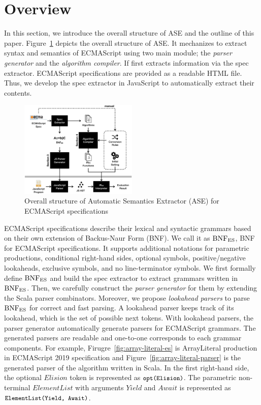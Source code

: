\section{Overview}

In this section, we introduce the overall structure of ASE and the outline of
this paper. Figure~\ref{fig:overview} depicts the overall structure of ASE.
It mechanizes to extract syntax and semantics of ECMAScript using
two main module; the \textit{parser generator} and the \textit{algorithm compiler}.
If first extracts information via the spec extractor.
ECMAScript specifications are provided as a readable HTML file.
Thus, we develop the spec extractor in JavaScript to automatically
extract their contents.

\begin{figure}
  \centering
  \includegraphics[width=0.5\textwidth]{img/overview.png}
  \caption{Overall structure of Automatic Semantics Extractor (ASE)
  for ECMAScript specifications}
  \label{fig:overview}
\end{figure}

ECMAScript specifications describe their lexical and syntactic grammars
based on their own extension of Backus-Naur Form (BNF).
We call it as \( \text{BNF}_{\text{ES}} \), BNF for ECMAScript specifications.
It supports additional notations for parametric productions, conditional
right-hand sides, optional symbols, positive/negative lookaheads,
exclusive symbols, and no line-terminator symbols. We first formally define
\( \text{BNF}_{\text{ES}} \) and build the spec extractor to extract grammars written in \( \text{BNF}_{\text{ES}} \).
Then, we carefully construct the \textit{parser generator} for them by extending
the Scala parser combinators. Moreover, we propose \textit{lookahead parsers}
to parse \( \text{BNF}_{\text{ES}} \) for correct and fast parsing.
A lookahead parser keeps track of its lookahead, which is the set of
possible next tokens. With lookahead parsers,
the parser generator automatically generate parsers for ECMAScript grammars.
The generated parsers are readable and one-to-one corresponds to each
grammar components.
For example, Firugre~\ref{fig:array-literal-es} is ArrayLiteral production in
ECMAScript 2019 specification and Figure~\ref{fig:array-literal-parser}
is the generated parser of the algorithm written in Scala.
In the first right-hand side, the optional \( Elision \) token
is represented as \( \texttt{\small opt(Elision)} \).
The parametric non-terminal \( ElementList \) with arguments \( Yield \)
and \( Await \) is represented as \( \texttt{\small ElementList(Yield, Await)} \).


